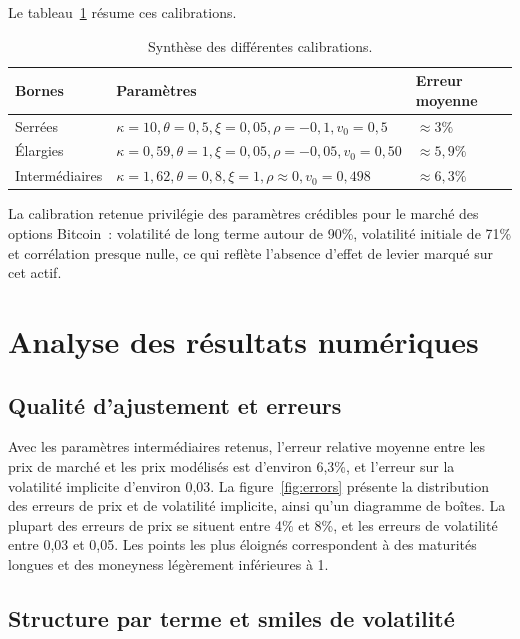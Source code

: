 \documentclass[12pt,a4paper]{article}
\begin{document}
Le tableau \ref{tab:calib} résume ces calibrations.

\begin{table}[h]
  \centering
  \begin{tabular}{lllll}
    \toprule
    Bornes & Paramètres & Erreur moyenne \\ \midrule
    Serrées & $\kappa=10,\theta=0{,}5,\xi=0{,}05,\rho=-0{,}1,v_0=0{,}5$ & $\approx3\%$ \\
    Élargies & $\kappa=0{,}59,\theta=1,\xi=0{,}05,\rho=-0{,}05,v_0=0{,}50$ & $\approx5{,}9\%$ & \\
    Intermédiaires & $\kappa=1{,}62,\theta=0{,}8,\xi=1,\rho\approx0,v_0=0{,}498$ & $\approx6{,}3\%$ \\
    \bottomrule
  \end{tabular}
  \caption{Synthèse des différentes calibrations.}
  \label{tab:calib}
\end{table}

La calibration retenue privilégie des paramètres crédibles pour le marché des options Bitcoin : volatilité de long terme autour de 90\%, volatilité initiale de 71\% et corrélation presque nulle, ce qui reflète l’absence d’effet de levier marqué sur cet actif.

\section{Analyse des résultats numériques}

\subsection{Qualité d'ajustement et erreurs}

Avec les paramètres intermédiaires retenus, l'erreur relative moyenne entre les prix de marché et les prix modélisés est d'environ 6,3\%, et l'erreur sur la volatilité implicite d'environ 0,03.  La figure~\ref{fig:errors} présente la distribution des erreurs de prix et de volatilité implicite, ainsi qu'un diagramme de boîtes.  La plupart des erreurs de prix se situent entre 4\% et 8\%, et les erreurs de volatilité entre 0,03 et 0,05.  Les points les plus éloignés correspondent à des maturités longues et des moneyness légèrement inférieures à 1.

\subsection{Structure par terme et smiles de volatilité}
\end{document}
